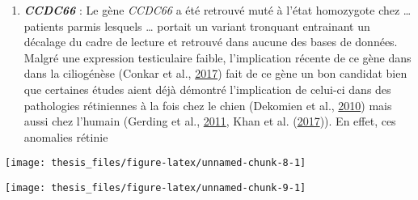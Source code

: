 \documentclass[12pt,twoside]{reedthesis}
\providecommand{\tightlist}{%
  \setlength{\itemsep}{0pt}\setlength{\parskip}{0pt}}
\theoremstyle{definition}
\theoremstyle{definition}
\theoremstyle{remark}
\begin{document}
  \begin{enumerate}
  \def\labelenumi{\arabic{enumi}.}
  \tightlist
  \item
    \textbf{\emph{CCDC66}} : Le gène \emph{CCDC66} a été retrouvé muté à
    l'état homozygote chez \ldots{} patients parmis lesquels \ldots{}
    portait un variant tronquant entrainant un décalage du cadre de
    lecture et retrouvé dans aucune des bases de données. Malgré une
    expression testiculaire faible, l'implication récente de ce gène dans
    dans la ciliogénèse (Conkar et al.,
    \protect\hyperlink{ref-Conkar2017}{2017}) fait de ce gène un bon
    candidat bien que certaines études aient déjà démontré l'implication
    de celui-ci dans des pathologies rétiniennes à la fois chez le chien
    (Dekomien et al., \protect\hyperlink{ref-Dekomien2010}{2010}) mais
    aussi chez l'humain (Gerding et al.,
    \protect\hyperlink{ref-Gerding2011}{2011}, Khan et al.
    (\protect\hyperlink{ref-Khan2017}{2017})). En effet, ces anomalies
    rétinie
  \end{enumerate}
  
  \newpage
  
  \begin{center}\texttt{[image: thesis\_files/figure-latex/unnamed-chunk-8-1]} \end{center}
  
  \newpage
  
  \begin{center}\texttt{[image: thesis\_files/figure-latex/unnamed-chunk-9-1]} \end{center}
  
  \newpage
  
\end{document}
